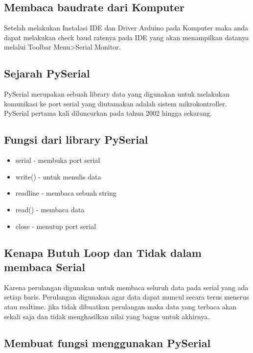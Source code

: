 \subsection{Membaca baudrate dari Komputer}
Setelah melakukan Instalasi IDE dan Driver Arduino pada Komputer maka anda dapat melakukan check baud ratenya pada IDE yang akan menampilkan datanya melalui Toolbar Menu>Serial Monitor.
\subsection{Sejarah PySerial}
 PySerial merupakan sebuah library data yang digunakan untuk melakukan komunikasi ke port serial yang diutamakan adalah sistem mikrokontroller. PySerial pertama kali diluncurkan pada tahun 2002 hingga sekarang.
\subsection{Fungsi dari library PySerial}
\begin{itemize}
\item serial - membuka port serial
\item write() - untuk menulis data
\item readline - membaca sebuah string
\item read() - membaca data 
\item close - menutup port serial
\end{itemize}
\subsection{Kenapa Butuh Loop dan Tidak dalam membaca Serial}
Karena perulangan digunakan untuk membaca seluruh data pada serial yang ada setiap baris. Perulangan digunakan agar data dapat muncul secara terus menerus atau realtime. jika tidak dibuatkan perulangan maka data yang terbaca akan sekali saja dan tidak menghasilkan nilai yang bagus untuk akhirnya.
\subsection{Membuat fungsi menggunakan PySerial}















